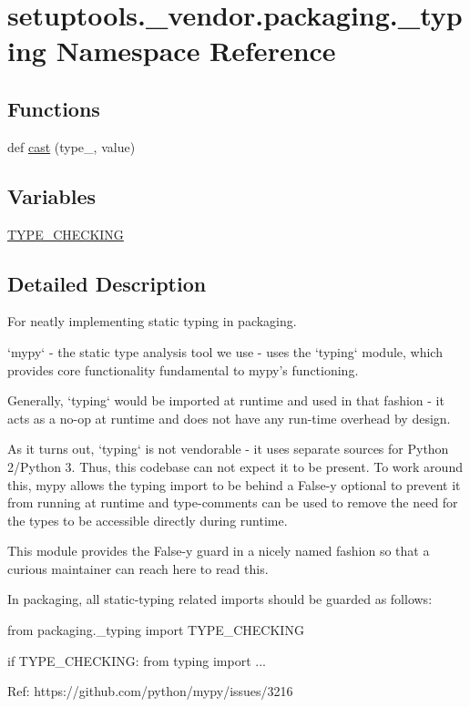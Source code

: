 \hypertarget{namespacesetuptools_1_1__vendor_1_1packaging_1_1__typing}{}\section{setuptools.\+\_\+vendor.\+packaging.\+\_\+typing Namespace Reference}
\label{namespacesetuptools_1_1__vendor_1_1packaging_1_1__typing}
\subsection*{Functions}
\begin{DoxyCompactItemize}
\item 
def \hyperlink{namespacesetuptools_1_1__vendor_1_1packaging_1_1__typing_abf22b34489ca3a1d164be475a003377a}{cast} (type\+\_\+, value)
\end{DoxyCompactItemize}
\subsection*{Variables}
\begin{DoxyCompactItemize}
\item 
\hyperlink{namespacesetuptools_1_1__vendor_1_1packaging_1_1__typing_a8a2f3959976c667cd26443830f348e0a}{T\+Y\+P\+E\+\_\+\+C\+H\+E\+C\+K\+I\+NG}
\end{DoxyCompactItemize}


\subsection{Detailed Description}
\begin{DoxyVerb}For neatly implementing static typing in packaging.

`mypy` - the static type analysis tool we use - uses the `typing` module, which
provides core functionality fundamental to mypy's functioning.

Generally, `typing` would be imported at runtime and used in that fashion -
it acts as a no-op at runtime and does not have any run-time overhead by
design.

As it turns out, `typing` is not vendorable - it uses separate sources for
Python 2/Python 3. Thus, this codebase can not expect it to be present.
To work around this, mypy allows the typing import to be behind a False-y
optional to prevent it from running at runtime and type-comments can be used
to remove the need for the types to be accessible directly during runtime.

This module provides the False-y guard in a nicely named fashion so that a
curious maintainer can reach here to read this.

In packaging, all static-typing related imports should be guarded as follows:

    from packaging._typing import TYPE_CHECKING

    if TYPE_CHECKING:
from typing import ...

Ref: https://github.com/python/mypy/issues/3216
\end{DoxyVerb}
 

